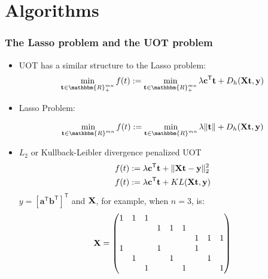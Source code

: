 \documentclass[dvipdfmx,cjk,t,10pt]{beamer}
\newcommand{\tranT}{\mathsf T}
\newcommand{\R}{\mathbbm{R}}
\renewcommand{\vec}[1]{\mathbf{#1}}
\begin{document}
\section{Algorithms}
\begin{frame}
\frametitle{The Lasso problem and the UOT problem}
	
	\begin{itemize}
	\item UOT has a similar structure to the Lasso problem:
$$
\begin{aligned}
\min_{\vec{t} \in \R_{+}^{mn}} f(t) := \min_{\vec{t} \in \R_{+}^{mn}}\lambda \vec{c}^{\tranT}\vec{t} + D_h(\mat{X}\vec{t},\vec{y})
\end{aligned}
$$
\item Lasso Problem:

\begin{equation}
\label{eq:uot}
\min_{\vec{t} \in \R^{mn}} f(t) := \min_{\vec{t} \in \R^{mn}} \lambda \|\vec{t}\| + D_h(\mat{X}\vec{t},\vec{y})
\end{equation}
\item $L_2$ or Kullback-Leibler divergence penalized UOT
$$
\begin{aligned}
f(t) &:= \lambda \vec{c}^{\tranT}\vec{t} + \|\mat{X}\vec{t}-\vec{y}\|_2^2\\
f(t) &:= \lambda \vec{c}^{\tranT}\vec{t} + KL(\mat{X}\vec{t},\vec{y})
\end{aligned}
$$
$y=[\vec{a}^{\tranT} \vec{b}^{\tranT}]^{\tranT}$ and $\mbox{\bf X}$, for example, when $n=3$, is:
\begin{align}
 \mbox{\bf X}= 
\begin{pmatrix}
1&1&1& & & & & &\\
 & & &1&1&1& & &\\
 & & & & & &1&1&1\\
1& & &1& & &1& &\\
 &1& & &1& & &1&\\
 & &1& & &1& & &1\\
\end{pmatrix}
\end{align}	
\end{itemize}
\end{frame}
\end{document}
